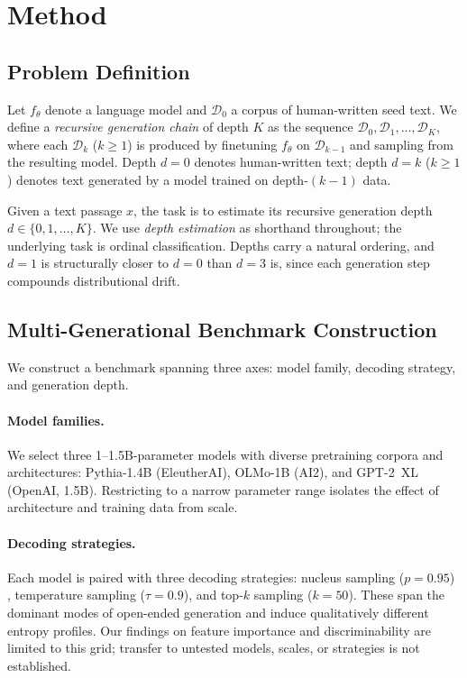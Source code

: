 \section{Method}
\label{sec:method}

\subsection{Problem Definition}
\label{sec:method:problem}

Let $f_\theta$ denote a language model and $\mathcal{D}_0$ a corpus of human-written seed text.
We define a \emph{recursive generation chain} of depth $K$ as the sequence $\mathcal{D}_0, \mathcal{D}_1, \dots, \mathcal{D}_K$, where each $\mathcal{D}_k$ ($k \geq 1$) is produced by finetuning $f_\theta$ on $\mathcal{D}_{k-1}$ and sampling from the resulting model.
Depth $d{=}0$ denotes human-written text; depth $d{=}k$ ($k \geq 1$) denotes text generated by a model trained on depth-$(k{-}1)$ data.

Given a text passage $x$, the task is to estimate its recursive generation depth $d \in \{0, 1, \dots, K\}$.
We use \emph{depth estimation} as shorthand throughout; the underlying task is ordinal classification.
Depths carry a natural ordering, and $d{=}1$ is structurally closer to $d{=}0$ than $d{=}3$ is, since each generation step compounds distributional drift.

\subsection{Multi-Generational Benchmark Construction}
\label{sec:method:benchmark}

We construct a benchmark spanning three axes: model family, decoding strategy, and generation depth.

\paragraph{Model families.}
We select three 1--1.5B-parameter models with diverse pretraining corpora and architectures: Pythia-1.4B (EleutherAI), OLMo-1B (AI2), and GPT-2~XL (OpenAI, 1.5B).
Restricting to a narrow parameter range isolates the effect of architecture and training data from scale.

\paragraph{Decoding strategies.}
Each model is paired with three decoding strategies: nucleus sampling ($p{=}0.95$) \cite{holtzman2020_nucleus}, temperature sampling ($\tau{=}0.9$), and top-$k$ sampling ($k{=}50$).
These span the dominant modes of open-ended generation and induce qualitatively different entropy profiles.
Our findings on feature importance and discriminability are limited to this grid; transfer to untested models, scales, or strategies is not established.

